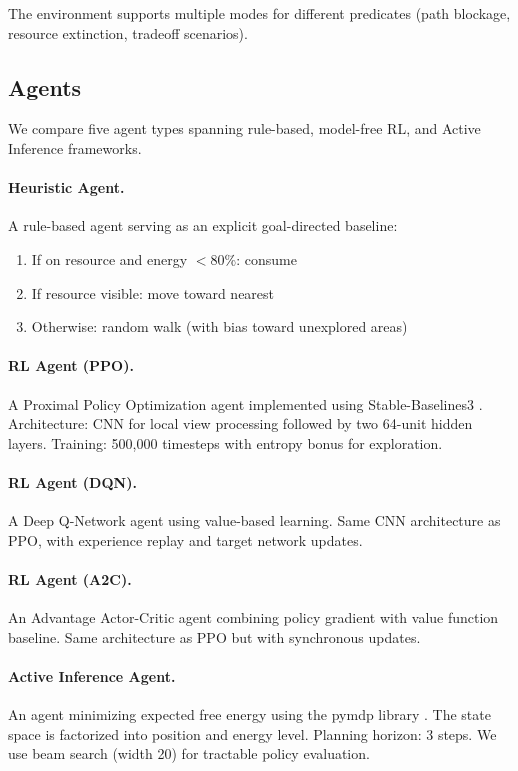 \documentclass{article}
\begin{document}
The environment supports multiple modes for different predicates (path blockage, resource extinction, tradeoff scenarios).

\subsection{Agents}

We compare five agent types spanning rule-based, model-free RL, and Active Inference frameworks.

\paragraph{Heuristic Agent.} A rule-based agent serving as an explicit goal-directed baseline:
\begin{enumerate}
    \item If on resource and energy $< 80\%$: consume
    \item If resource visible: move toward nearest
    \item Otherwise: random walk (with bias toward unexplored areas)
\end{enumerate}

\paragraph{RL Agent (PPO).} A Proximal Policy Optimization agent \cite{schulman2017proximal} implemented using Stable-Baselines3 \cite{raffin2021stable}. Architecture: CNN for local view processing followed by two 64-unit hidden layers. Training: 500,000 timesteps with entropy bonus for exploration.

\paragraph{RL Agent (DQN).} A Deep Q-Network agent using value-based learning. Same CNN architecture as PPO, with experience replay and target network updates.

\paragraph{RL Agent (A2C).} An Advantage Actor-Critic agent combining policy gradient with value function baseline. Same architecture as PPO but with synchronous updates.

\paragraph{Active Inference Agent.} An agent minimizing expected free energy using the pymdp library \cite{heins2022pymdp}. The state space is factorized into position and energy level. Planning horizon: 3 steps. We use beam search (width 20) for tractable policy evaluation.
\end{document}
